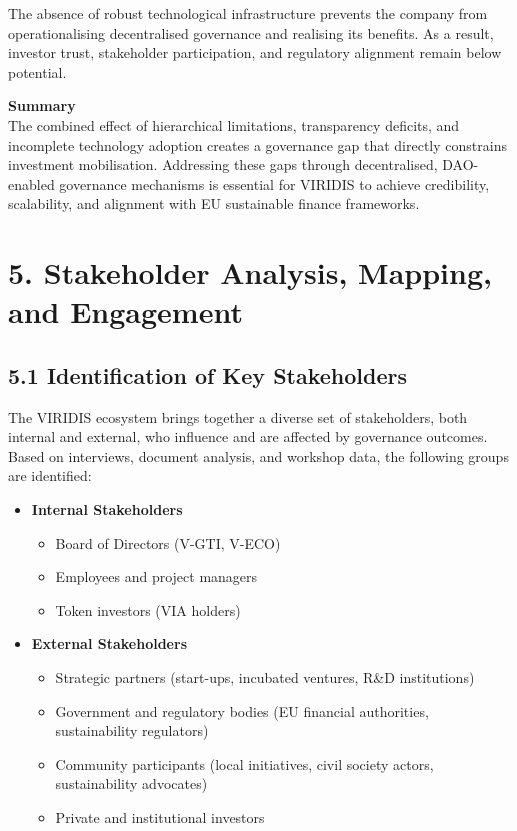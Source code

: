 \documentclass[
  english,
  12pt,
  oneside,
  open=any]{scrbook}
\providecommand{\tightlist}{%
  \setlength{\itemsep}{0pt}\setlength{\parskip}{0pt}}\usepackage{longtable,booktabs,array}
\begin{document}
The absence of robust technological infrastructure prevents the company
from operationalising decentralised governance and realising its
benefits. As a result, investor trust, stakeholder participation, and
regulatory alignment remain below potential.

\textbf{Summary}\\
The combined effect of hierarchical limitations, transparency deficits,
and incomplete technology adoption creates a governance gap that
directly constrains investment mobilisation. Addressing these gaps
through decentralised, DAO-enabled governance mechanisms is essential
for VIRIDIS to achieve credibility, scalability, and alignment with EU
sustainable finance frameworks.

\chapter{5. Stakeholder Analysis, Mapping, and
Engagement}\label{sec-engagement}

\section{5.1 Identification of Key Stakeholders}\label{sec-ident}

The VIRIDIS ecosystem brings together a diverse set of stakeholders,
both internal and external, who influence and are affected by governance
outcomes. Based on interviews, document analysis, and workshop data, the
following groups are identified:

\begin{itemize}
\tightlist
\item
  \textbf{Internal Stakeholders}

  \begin{itemize}
  \tightlist
  \item
    Board of Directors (V-GTI, V-ECO)\\
  \item
    Employees and project managers\\
  \item
    Token investors (VIA holders)
  \end{itemize}
\item
  \textbf{External Stakeholders}

  \begin{itemize}
  \tightlist
  \item
    Strategic partners (start-ups, incubated ventures, R\&D
    institutions)\\
  \item
    Government and regulatory bodies (EU financial authorities,
    sustainability regulators)\\
  \item
    Community participants (local initiatives, civil society actors,
    sustainability advocates)\\
  \item
    Private and institutional investors
  \end{itemize}
\end{itemize}
\end{document}
